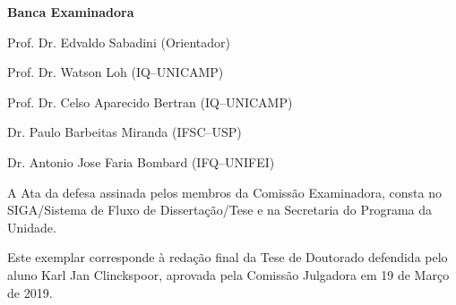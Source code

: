 \documentclass[
	12pt,				%
	oneside,
	a4paper,			%
	english,			%
	brazil%
	]{abntex2}
\begin{document}
\begin{folhadeaprovacao}

%
%    

	{\Large\ABNTEXchapterfont\textbf{Banca Examinadora}}
	
	\vspace{1cm}
	
	Prof. Dr. Edvaldo Sabadini (Orientador)
	
	Prof. Dr. Watson Loh (IQ--UNICAMP)
	
	Prof. Dr. Celso Aparecido Bertran (IQ--UNICAMP)
	
	Dr. Paulo Barbeitas Miranda (IFSC--USP)
	
	Dr. Antonio Jose Faria Bombard (IFQ--UNIFEI)
	
	\vspace*{\fill}
	
	\noindent A Ata da defesa assinada pelos membros da Comissão Examinadora, consta no SIGA/Sistema de Fluxo de Dissertação/Tese e na Secretaria do Programa da Unidade.
	
	\vspace*{\fill}
	
	\hspace*{\fill}\begin{minipage}[r][5cm]{6cm}		%
		Este exemplar corresponde à redação final da Tese de Doutorado defendida pelo aluno Karl Jan Clinckspoor, aprovada pela Comissão Julgadora em 19 de Março de 2019.
	\end{minipage}
	

	\vspace*{\fill}
		
        


\end{folhadeaprovacao}
\end{document}
